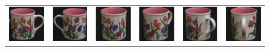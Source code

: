 \begin{figure}[p]
\begin{center}
\begin{tabular}{cccccc}
\includegraphics[width=2cm]{coil/beeld-6.eps} &
\includegraphics[width=2cm]{coil/beeld-7.eps} &
\includegraphics[width=2cm]{coil/beeld-8.eps} &
\includegraphics[width=2cm]{coil/beeld-9.eps} &
\includegraphics[width=2cm]{coil/beeld-10.eps} &
\includegraphics[width=2cm]{coil/beeld-11.eps} \\


\end{tabular}
\end{center}
\end{figure}
